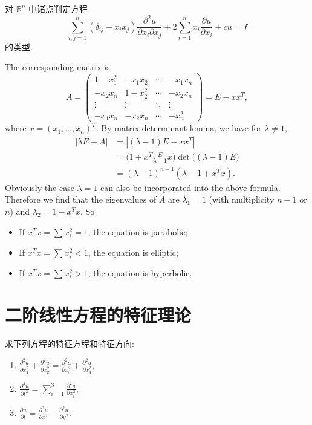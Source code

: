 \begin{exercise}
  对 $\mathbb{R}^n$ 中诸点判定方程
  \[ \sum_{i,j=1}^n (\delta_{ij}-x_ix_j)\frac{\partial^2 u}{\partial x_i\partial x_j}
      + 2\sum_{i=1}^n x_i \frac{\partial u}{\partial x_i} + cu = f \]
  的类型.
\end{exercise}

\begin{solution}
  The corresponding matrix is
  \[ A = \begin{pmatrix}
          1-x_1^2 & -x_1x_2 & \cdots & -x_1x_n \\
          -x_2x_n & 1-x_2^2 & \cdots & -x_2x_n \\
          \vdots  & \vdots  & \ddots & \vdots  \\
          -x_1x_n & -x_2x_n & \cdots & -x_n^2
        \end{pmatrix}
       = E - xx^T,
  \]
  where $x = (x_1,\ldots,x_n)^T$. By \href{https://en.wikipedia.org/wiki/Matrix_determinant_lemma}{matrix determinant lemma}, we have for $\lambda\neq 1$,
  \begin{align*}
    |\lambda E-A|
    & = |(\lambda-1)E + xx^T| \\
    & = \biggl(1 + x^T\frac{E}{\lambda-1}x\biggr) \det \bigl((\lambda-1)E\bigr) \\
    & = (\lambda-1)^{n-1} (\lambda-1+x^Tx).
  \end{align*}
  Obviously the case $\lambda=1$ can also be incorporated into the above formula.
  Therefore we find that the eigenvalues of $A$ are $\lambda_1=1$
  (with multiplicity $n-1$ or $n$)
  and $\lambda_2 = 1-x^Tx$. So
  \begin{itemize}
    \item If $x^Tx = \sum x_i^2 =1$, the equation is parabolic;
    \item If $x^Tx = \sum x_i^2 <1$, the equation is elliptic;
    \item If $x^Tx = \sum x_i^2 >1$, the equation is hyperbolic. \qedhere
  \end{itemize}
\end{solution}


\section{二阶线性方程的特征理论}


\begin{exercise}
  求下列方程的特征方程和特征方向:
  \begin{enumerate}[(1)]
    \item $\displaystyle\frac{\partial^2 u}{\partial x_1^2} + \frac{\partial^2 u}{\partial x_2^2} = \frac{\partial^2 u}{\partial x_3^2} + \frac{\partial^2 u}{\partial x_4^2}$,
    \item $\displaystyle\frac{\partial^2 u}{\partial t^2} = \sum_{i=1}^3 \frac{\partial^2 u}{\partial x_i^2}$,
    \item $\displaystyle\frac{\partial u}{\partial t} = \frac{\partial^2 u}{\partial x^2} - \frac{\partial^2 u}{\partial y^2}$.
  \end{enumerate}
\end{exercise}


